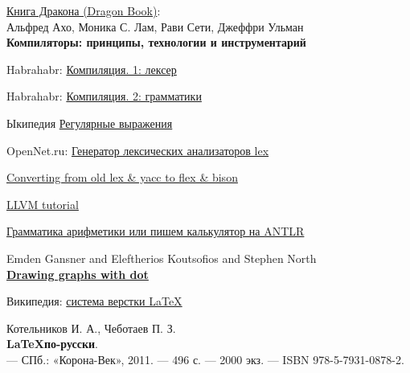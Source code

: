 
\begin{thebibliography}{99}


\href{https://drive.google.com/file/d/0B0u4WeMjO894LS1Jb3JUbEVSVkE/view?usp=sharing}{Книга Дракона (Dragon Book)}:\\
Альфред Ахо, Моника С. Лам, Рави Сети, Джеффри Ульман\\
\textbf{Компиляторы: принципы, технологии и инструментарий}

 Habrahabr: \href{http://habrahabr.ru/post/99162/}{Компиляция. 1: лексер}

 Habrahabr: \href{http://habrahabr.ru/post/99298/}{Компиляция. 2: грамматики}

 Ыкипедия
\href{https://ru.wikipedia.org/wiki/%D0%A0%D0%B5%D0%B3%D1%83%D0%BB%D1%8F%D1%80%D0%BD%D1%8B%D0%B5_%D0%B2%D1%8B%D1%80%D0%B0%D0%B6%D0%B5%D0%BD%D0%B8%D1%8F}{Регулярные выражения}

 OpenNet.ru:
\href{https://www.opennet.ru/soft/ruprog/lex.txt}{Генератор лексических анализаторов lex}

\href{http://www.di-mgt.com.au/converting_from_lex_and_yacc.html}{Converting from old lex \& yacc to flex \& bison}


 \href{http://llvm.org/docs/tutorial/}{LLVM tutorial}


 \href{http://habrahabr.ru/post/110710/}{Грамматика 
арифметики или пишем калькулятор на ANTLR}


Emden Gansner and Eleftherios Koutsofios and Stephen North\\
\textbf{\href{http://www.graphviz.org/Documentation/dotguide.pdf}{Drawing graphs with dot}}


 Википедия:
\href{https://ru.wikipedia.org/wiki/LaTeX}{система верстки \LaTeX}

Котельников И. А., Чеботаев П. З.\\ 
\textbf{\LaTeX по-русски}.\\
— СПб.: «Корона-Век», 2011. — 496 с. — 2000 экз. — ISBN 978-5-7931-0878-2.


\end{thebibliography}
